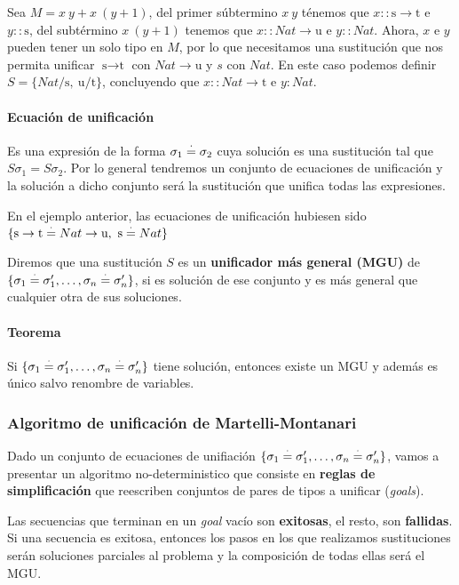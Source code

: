 Sea $M = x~y + x~(y+1)$, del primer súbtermino $x~y$ ténemos que $x :: \text{s}\to \text{t}$ e $y :: \text{s}$, del subtérmino $x~(y+1)$ tenemos que $x::Nat\to \text{u}$ e $y :: Nat$. Ahora, $x$ e $y$ pueden tener un solo tipo en $M$, por lo que necesitamos una sustitución que nos permita unificar $\text{s}\to \text{t}$ con $Nat\to \text{u}$ y $s$ con $Nat$. En este caso podemos definir $S = \{Nat/\text{s},~\text{u}/\text{t}\}$, concluyendo que $x :: Nat\to\text{t}$ e $y:Nat$.

\paragraph{Ecuación de unificación} Es una expresión de la forma $\sigma_1 \overset{\cdot}{=} \sigma_2$ cuya solución es una sustitución tal que $S\sigma_1 = S\sigma_2$. Por lo general tendremos un conjunto de ecuaciones de unificación y la solución a dicho conjunto será la sustitución que unifica todas las expresiones.

En el ejemplo anterior, las ecuaciones de unificación hubiesen sido $\{\text{s}\to\text{t}\overset{\cdot}{=} Nat\to\text{u},~\text{s}\overset{\cdot}{=} Nat\}$

Diremos que una sustitución $S$ es un \textbf{unificador más general (MGU)} de $\{\sigma_1 \overset{\cdot}{=} \sigma_1',\dots,\sigma_n \overset{\cdot}{=} \sigma_n'\}$, si es solución de ese conjunto y es más general que cualquier otra de sus soluciones.



\paragraph{Teorema} Si $\{\sigma_1 \overset{\cdot}{=} \sigma_1',\dots,\sigma_n \overset{\cdot}{=} \sigma_n'\}$ tiene solución, entonces existe un MGU y además es único salvo renombre de variables.

\subsubsection{Algoritmo de unificación de Martelli-Montanari}

Dado un conjunto de ecuaciones de unifiación $\{\sigma_1 \overset{\cdot}{=} \sigma_1',\dots,\sigma_n \overset{\cdot}{=} \sigma_n'\}$, vamos a presentar un algoritmo no-deterministico que consiste en \textbf{reglas de simplificación} que reescriben conjuntos de pares de tipos a unificar (\textit{goals}).

Las secuencias que terminan en un \textit{goal} vacío son \textbf{exitosas}, el resto, son \textbf{fallidas}. Si una secuencia es exitosa, entonces los pasos en los que realizamos sustituciones serán soluciones parciales al problema y la composición de todas ellas será el MGU.

